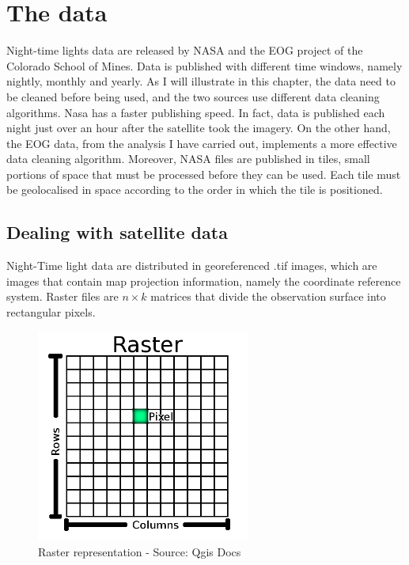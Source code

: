\chapter{The data}\label{ch:mathtest} %
Night-time lights data are released by NASA and the EOG project of the Colorado School of Mines. Data is published with different time windows, namely nightly, monthly and yearly.
As I will illustrate in this chapter, the data need to be cleaned before being used, and the two sources use different data cleaning algorithms. Nasa has a faster publishing speed. In fact, data is published each night just over an hour after the satellite took the imagery. On the other hand, the EOG data, from the analysis I have carried out, implements a more effective data cleaning algorithm. Moreover, NASA files are published in tiles, small portions of space that must be processed before they can be used. Each tile must be geolocalised in space according to the order in which the tile is positioned.

\section{Dealing with satellite data}

Night-Time light data are distributed in georeferenced .tif images, which are images that contain map projection information, namely the coordinate reference system. 
Raster files are  $n \times k$  matrices that divide the observation surface into rectangular pixels.

\begin{figure}[h]
    \begin{center}
    \includegraphics[width=7cm]{images/raster_dataset.png}
    \end{center}
    \caption{Raster representation - Source: Qgis Docs}
\end{figure}


